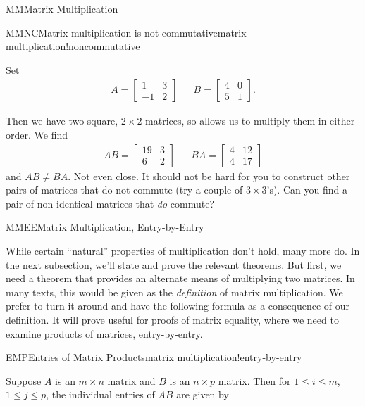 \begin{subsect}{MM}{Matrix Multiplication}
\begin{example}{MMNC}{Matrix multiplication is not commutative}{matrix multiplication!noncommutative}
\begin{para}Set
%
\begin{align*}
A=
\begin{bmatrix}
1 & 3\\
-1 & 2
\end{bmatrix}
&&
B=
\begin{bmatrix}
4&0\\
5&1
\end{bmatrix}.
\end{align*}\end{para}
%
\begin{para}Then we have two square, $2\times 2$ matrices, so  allows us to multiply them in either order.  We find
%
\begin{align*}
AB=
\begin{bmatrix}
19 & 3\\
6 & 2
\end{bmatrix}
&&
BA=
\begin{bmatrix}
4 & 12\\
4 & 17
\end{bmatrix}
\end{align*}
%
and $AB\neq BA$.  Not even close.  It should not be hard for you to construct other pairs of matrices that do not commute (try a couple of $3\times 3$'s).  Can you find a pair of non-identical matrices that {\em do} commute?\end{para}
%
\end{example}
%
\begin{subsect}{MMEE}{Matrix Multiplication, Entry-by-Entry}
%
\begin{para}While certain ``natural'' properties of multiplication don't hold, many more do.  In the next subsection, we'll state and prove the relevant theorems.  But first, we need a theorem that provides an alternate means of multiplying two matrices.  In many texts, this would be given as the {\em definition} of matrix multiplication.  We prefer to turn it around and have the following formula as a consequence of our definition.  It will prove useful for proofs of matrix equality, where we need to examine products of matrices, entry-by-entry.\end{para}
%
\begin{theorem}{EMP}{Entries of Matrix Products}{matrix multiplication!entry-by-entry}
\begin{para}Suppose $A$ is an $m\times n$ matrix and $B$ is an $n\times p$ matrix.  Then for $1\leq i\leq m$, $1\leq j\leq p$, the individual entries of $AB$ are given by

\end{para}
\end{theorem}
\end{subsect}
\end{subsect}
